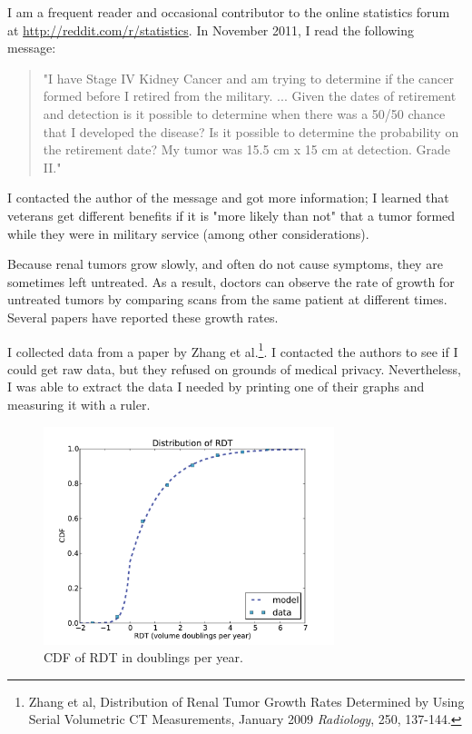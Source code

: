 \documentclass[12pt]{book}
\begin{document}
I am a frequent reader and occasional contributor to the online statistics
forum at \url{http://reddit.com/r/statistics}.  In November 2011, I read
the following message:

\begin{quote}
"I have Stage IV Kidney Cancer and am trying to determine if the
  cancer formed before I retired from the military. ... Given the
  dates of retirement and detection is it possible to determine when
  there was a 50/50 chance that I developed the disease? Is it
  possible to determine the probability on the retirement date?  My
  tumor was 15.5 cm x 15 cm at detection. Grade II."
\end{quote}

I contacted the author of the message and got more information; I learned
that veterans get different benefits if it is "more likely than not"
that a tumor formed while they were in military service (among other
considerations).

Because renal tumors grow slowly, and often do not cause symptoms,
they are sometimes left untreated.  As a result, doctors can observe
the rate of growth for untreated tumors by comparing scans from the
same patient at different times.  Several papers have reported these
growth rates.

I collected data from a paper by Zhang et al.\footnote{Zhang et al,
  Distribution of Renal Tumor Growth Rates Determined by Using Serial
  Volumetric CT Measurements, January 2009 {\it Radiology}, 250,
  137-144.}.  I contacted the authors to see if I could get raw data,
but they refused on grounds of medical privacy.  Nevertheless, I was
able to extract the data I needed by printing one of their graphs and
measuring it with a ruler.

\begin{figure}
\centerline{\includegraphics[height=2.5in]{figs/kidney2.pdf}}
\caption{CDF of RDT in doublings per year.}
\label{fig.kidney2}
\end{figure}
\end{document}
